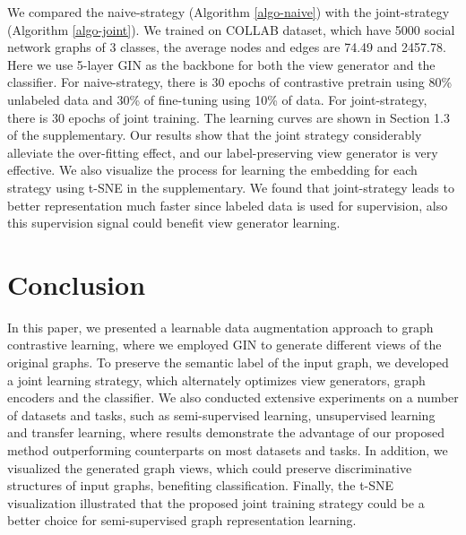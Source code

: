 We compared the naive-strategy (Algorithm \ref{algo-naive}) with the joint-strategy (Algorithm \ref{algo-joint}). We trained on COLLAB  dataset, which have 5000 social network graphs of 3 classes, the average nodes and edges are 74.49 and 2457.78. Here we use 5-layer GIN \cite{xu2018gin} as the backbone for both the view generator and the classifier. For naive-strategy, there is 30 epochs of contrastive pretrain using 80\% unlabeled data and 30\% of fine-tuning using 10\% of data. For joint-strategy, there is 30 epochs of joint training. The learning curves are shown in Section 1.3 of the supplementary. Our results show that the joint strategy considerably alleviate the over-fitting effect, and our label-preserving view generator is very effective. We also visualize the process for learning the embedding for each strategy using t-SNE \cite{van2008tsne} in the supplementary. We found that joint-strategy leads to better representation much faster since labeled data is used for supervision, also this supervision signal could benefit view generator learning. 

\section{Conclusion}
In this paper, we presented a learnable data augmentation approach to graph contrastive learning, where we employed GIN to generate different views of the original graphs. To preserve the semantic label of the input graph, we developed a joint learning strategy, which alternately optimizes view generators, graph encoders and the classifier. We also conducted extensive experiments on a number of datasets and tasks, such as semi-supervised learning, unsupervised learning and transfer learning, where results demonstrate the advantage of our proposed method outperforming counterparts on most datasets and tasks. In addition, we visualized the generated graph views, which could preserve discriminative structures of input graphs, benefiting classification. Finally, the t-SNE visualization illustrated that the proposed joint training strategy could be a better choice for semi-supervised graph representation learning.

